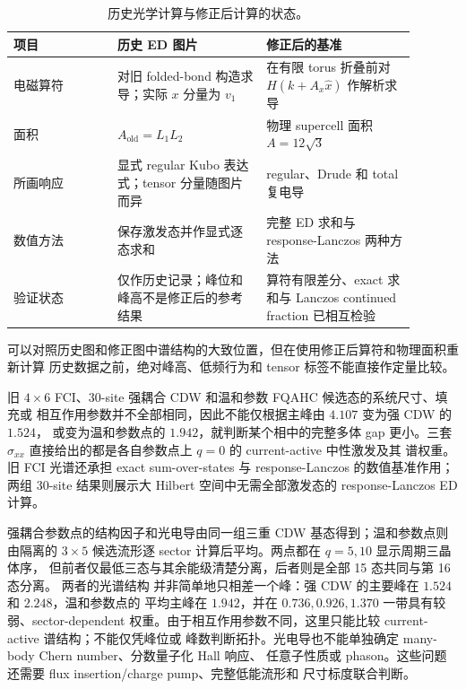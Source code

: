 \documentclass[11pt]{article}
\begin{document}
\begin{table}[h]
\centering
\small
\caption{历史光学计算与修正后计算的状态。}
\begin{tabular}{p{0.23\linewidth}p{0.33\linewidth}p{0.33\linewidth}}
\toprule
项目 & 历史 ED 图片 & 修正后的基准 \\
\midrule
电磁算符 & 对旧 folded-bond 构造求导；实际 \(x\) 分量为 \(v_1\) & 在有限 torus
折叠前对 \(H(k+A_x\hat{x})\) 作解析求导 \\
面积 & \(A_{\mathrm{old}}=L_1L_2\) & 物理 supercell 面积 \(A=12\sqrt{3}\) \\
所画响应 & 显式 regular Kubo 表达式；tensor 分量随图片而异 & regular、Drude
和 total 复电导 \\
数值方法 & 保存激发态并作显式逐态求和 & 完整 ED 求和与 response-Lanczos 两种方法 \\
验证状态 & 仅作历史记录；峰位和峰高不是修正后的参考结果 & 算符有限差分、exact
求和与 Lanczos continued fraction 已相互检验 \\
\bottomrule
\end{tabular}
\end{table}

可以对照历史图和修正图中谱结构的大致位置，但在使用修正后算符和物理面积重新计算
历史数据之前，绝对峰高、低频行为和 tensor 标签不能直接作定量比较。

旧 \(4\times6\) FCI、30-site 强耦合 CDW 和温和参数 FQAHC 候选态的系统尺寸、填充或
相互作用参数并不全部相同，因此不能仅根据主峰由 \(4.107\) 变为强 CDW 的 \(1.524\)，
或变为温和参数点的 \(1.942\)，就判断某个相中的完整多体 gap 更小。三套
\(\sigma_{xx}\) 直接给出的都是各自参数点上 \(q=0\) 的 current-active 中性激发及其
谱权重。旧 FCI 光谱还承担 exact sum-over-states 与 response-Lanczos 的数值基准作用；
两组 30-site 结果则展示大 Hilbert 空间中无需全部激发态的 response-Lanczos ED 计算。

强耦合参数点的结构因子和光电导由同一组三重 CDW 基态得到；温和参数点则由隔离的
\(3\times5\) 候选流形逐 sector 计算后平均。两点都在 \(q=5,10\) 显示周期三晶体序，
但前者仅最低三态与其余能级清楚分离，后者则是全部 15 态共同与第 16 态分离。
两者的光谱结构
并非简单地只相差一个峰：强 CDW 的主要峰在 \(1.524\) 和 \(2.248\)，温和参数点的
平均主峰在 \(1.942\)，并在 \(0.736,0.926,1.370\) 一带具有较弱、sector-dependent
权重。由于相互作用参数不同，这里只能比较 current-active 谱结构；不能仅凭峰位或
峰数判断拓扑。光电导也不能单独确定 many-body Chern number、分数量子化 Hall 响应、
任意子性质或 phason。这些问题还需要 flux insertion/charge pump、完整低能流形和
尺寸标度联合判断。
\end{document}
